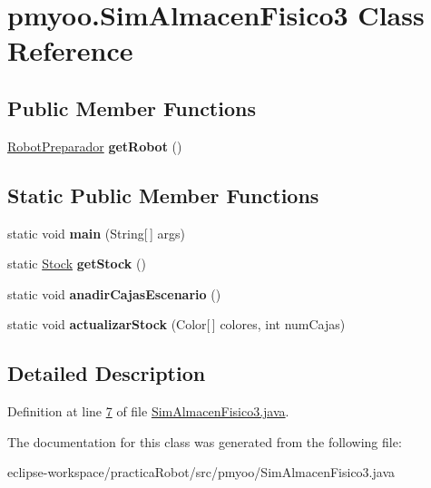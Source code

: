 \hypertarget{classpmyoo_1_1_sim_almacen_fisico3}{}\section{pmyoo.\+Sim\+Almacen\+Fisico3 Class Reference}
\label{classpmyoo_1_1_sim_almacen_fisico3}
\subsection*{Public Member Functions}
\begin{DoxyCompactItemize}
\item 
\mbox{\label{classpmyoo_1_1_sim_almacen_fisico3_a781543f3f1b367cd29faf686062d63db}} 
\mbox{\hyperlink{classpmyoo_1_1_robot_preparador}{Robot\+Preparador}} {\bfseries get\+Robot} ()
\end{DoxyCompactItemize}
\subsection*{Static Public Member Functions}
\begin{DoxyCompactItemize}
\item 
\mbox{\label{classpmyoo_1_1_sim_almacen_fisico3_a3fa2c3aa560d8d865d83ec3a71f874cf}} 
static void {\bfseries main} (String\mbox{[}$\,$\mbox{]} args)
\item 
\mbox{\label{classpmyoo_1_1_sim_almacen_fisico3_aa1a130c4bffb0c57f476ff20bbe212fa}} 
static \mbox{\hyperlink{classpmyoo_1_1_stock}{Stock}} {\bfseries get\+Stock} ()
\item 
\mbox{\label{classpmyoo_1_1_sim_almacen_fisico3_aeeb77e9a0b31d0fc723a0a1181e4e93b}} 
static void {\bfseries anadir\+Cajas\+Escenario} ()
\item 
\mbox{\label{classpmyoo_1_1_sim_almacen_fisico3_aa403d72c1f4a0de83d353a166e0f32b8}} 
static void {\bfseries actualizar\+Stock} (Color\mbox{[}$\,$\mbox{]} colores, int num\+Cajas)
\end{DoxyCompactItemize}


\subsection{Detailed Description}


Definition at line \mbox{\hyperlink{_sim_almacen_fisico3_8java_source_l00007}{7}} of file \mbox{\hyperlink{_sim_almacen_fisico3_8java_source}{Sim\+Almacen\+Fisico3.\+java}}.



The documentation for this class was generated from the following file\+:\begin{DoxyCompactItemize}
\item 
eclipse-\/workspace/practica\+Robot/src/pmyoo/Sim\+Almacen\+Fisico3.\+java\end{DoxyCompactItemize}

